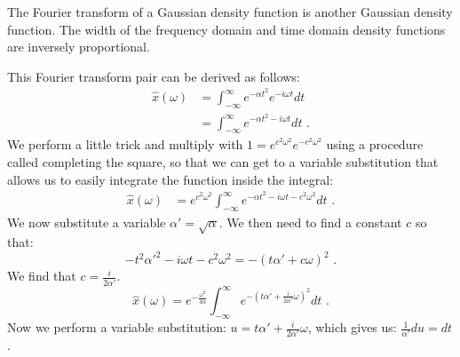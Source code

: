 \begin{marginfigure}
\begin{center}

\end{center}
\caption{The Fourier transform of a Gaussian density function is another Gaussian density function. The width of the frequency domain and time domain density functions are inversely proportional.}
\label{fig:gaussftf}
\end{marginfigure}

This Fourier transform pair can be derived as follows:
\begin{align}
\hat{x}(\omega) &= \int_{-\infty}^{\infty} e^{-\alpha t^2} e^{-i\omega t} dt \\
&= \int_{-\infty}^{\infty} e^{-\alpha t^2 - i\omega t} dt\,\,.
\end{align}
We perform a little trick and multiply with $1=e^{c^2\omega^2}e^{-c^2\omega^2}$ using a procedure called completing the square, so that we can get to a variable substitution that allows us to easily integrate the function inside the integral:
\begin{align}
\hat{x}(\omega) &= e^{c^2 \omega^2}\int_{-\infty}^{\infty} e^{-\alpha t^2 -i\omega t - c^2 \omega^2} dt\,\,.
\end{align}
We now substitute a variable $\alpha'=\sqrt{\alpha}$. We then need to find a constant $c$ so that:
\begin{equation}
-t^2\alpha'^2 - i\omega t - c^2 \omega^2 = -(t \alpha' + c\omega)^2\,\,.
\end{equation}
We find that $c=\frac{i}{2\alpha'}$.%
\begin{equation}
\hat{x}(\omega) = e^{-\frac{\omega^2}{4\alpha}} \int_{-\infty}^{\infty} e^{-\left(t\alpha' + \frac{i}{2\alpha'}\omega\right)^2} dt\,\,.
\end{equation}
Now we perform a variable substitution: $u=t\alpha' + \frac{i}{2\alpha'}\omega$, which gives us: $\frac{1}{\alpha'}du = dt$. 

